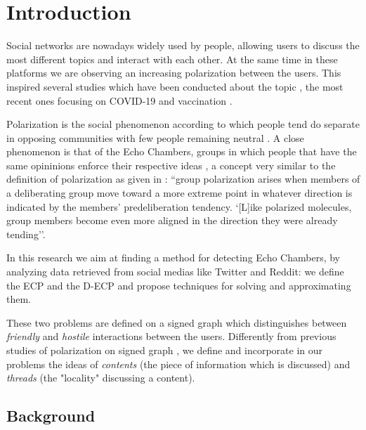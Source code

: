 \chapter{Introduction}
\label{ch:introduction}

Social networks are nowadays widely used by people, allowing users to
discuss the most different topics and interact with each other. At the same time in these
platforms we are observing an increasing polarization between the users.
This inspired several studies which have been conducted about the topic
\cite{Garimella2018}\cite{Guerra2013}\cite{conover2011political}\cite{gruzd2014investigating},
the most recent ones focusing on COVID-19
\cite{Jiang2021}\cite{green2020elusive}\cite{jiang2020political}\cite{lang2021maskon}
and vaccination \cite{Cossard2020}.

Polarization is the social phenomenon according to which people tend do
separate in opposing communities with few people remaining neutral
\cite{Guerra2013}. A close phenomenon is that of the Echo Chambers, groups in
which people that have the same opininions enforce their respective ideas
\cite{Garimella2018}, a concept very similar to the definition of polarization
as given in \cite{sunstein1999law}: ``group polarization arises when members of
a deliberating group move toward a more extreme point in whatever direction is
indicated by the members' predeliberation  tendency. `[L]ike polarized
molecules, group members become even more aligned in the direction they were
already tending''\cite{turner1987rediscovering}.

In this research we aim at finding a method for detecting Echo Chambers, by
analyzing data retrieved from social medias like Twitter and Reddit: we define
the \acrfull{ECP} and the \acrfull{D-ECP} and propose techniques for solving
and approximating them.

These two problems are defined on a signed graph which distinguishes
between \emph{friendly} and \emph{hostile} interactions between the users.
Differently from previous studies of polarization on signed graph
\cite{xiao2020searching}, we define
and incorporate in our problems the ideas of \emph{contents} (the piece of
information which is discussed) and \emph{threads} (the "locality"
discussing a content).

\section{Background}
\label{sec:background}

